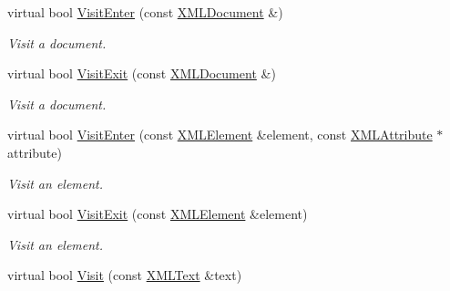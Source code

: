 \begin{DoxyCompactItemize}
\mbox{\label{classtinyxml2_1_1XMLPrinter_ae966b988a7a28c41e91c5ca17fb2054b}} 
virtual bool \mbox{\hyperlink{classtinyxml2_1_1XMLPrinter_ae966b988a7a28c41e91c5ca17fb2054b}{Visit\+Enter}} (const \mbox{\hyperlink{classtinyxml2_1_1XMLDocument}{X\+M\+L\+Document}} \&)
\begin{DoxyCompactList}\small\item\em Visit a document. \end{DoxyCompactList}\item 
\mbox{\label{classtinyxml2_1_1XMLPrinter_a15fc1f2b922f540917dcf52808737b29}} 
virtual bool \mbox{\hyperlink{classtinyxml2_1_1XMLPrinter_a15fc1f2b922f540917dcf52808737b29}{Visit\+Exit}} (const \mbox{\hyperlink{classtinyxml2_1_1XMLDocument}{X\+M\+L\+Document}} \&)
\begin{DoxyCompactList}\small\item\em Visit a document. \end{DoxyCompactList}\item 
\mbox{\label{classtinyxml2_1_1XMLPrinter_a2ce2aa508c21ac91615093ddb9c282c5}} 
virtual bool \mbox{\hyperlink{classtinyxml2_1_1XMLPrinter_a2ce2aa508c21ac91615093ddb9c282c5}{Visit\+Enter}} (const \mbox{\hyperlink{classtinyxml2_1_1XMLElement}{X\+M\+L\+Element}} \&element, const \mbox{\hyperlink{classtinyxml2_1_1XMLAttribute}{X\+M\+L\+Attribute}} $\ast$attribute)
\begin{DoxyCompactList}\small\item\em Visit an element. \end{DoxyCompactList}\item 
\mbox{\label{classtinyxml2_1_1XMLPrinter_ae99e0a7086543591edfb565f24689098}} 
virtual bool \mbox{\hyperlink{classtinyxml2_1_1XMLPrinter_ae99e0a7086543591edfb565f24689098}{Visit\+Exit}} (const \mbox{\hyperlink{classtinyxml2_1_1XMLElement}{X\+M\+L\+Element}} \&element)
\begin{DoxyCompactList}\small\item\em Visit an element. \end{DoxyCompactList}\item 
\mbox{\label{classtinyxml2_1_1XMLPrinter_a275ae25544a12199ae40b6994ca6e4de}} 
virtual bool \mbox{\hyperlink{classtinyxml2_1_1XMLPrinter_a275ae25544a12199ae40b6994ca6e4de}{Visit}} (const \mbox{\hyperlink{classtinyxml2_1_1XMLText}{X\+M\+L\+Text}} \&text)

\end{DoxyCompactItemize}

